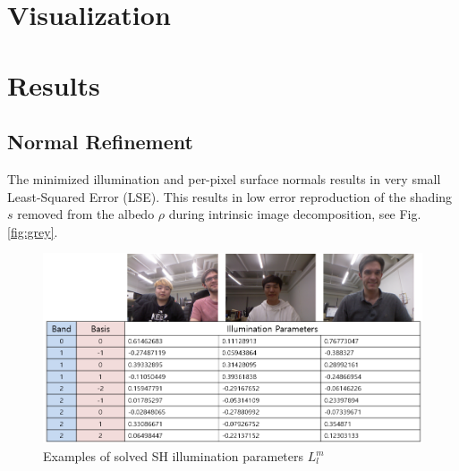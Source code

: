 \documentclass[10pt,twocolumn,letterpaper]{article}
\begin{document}
\section{Visualization}

\section{Results}
\subsection{Normal Refinement}
The minimized illumination and per-pixel surface normals results in very small Least-Squared Error (LSE). This results in low error reproduction of the shading $s$ removed from the albedo $\rho$ during intrinsic image decomposition, see Fig. \ref{fig:grey}. 


\begin{figure}[!h]
    \begin{center}
        \includegraphics [scale=0.33] {image/illum.png}
    \end{center}
    \caption{Examples of solved SH illumination parameters $L_l^m$}
    \label{fig:result-illum}
\end{figure} 
\end{document}
